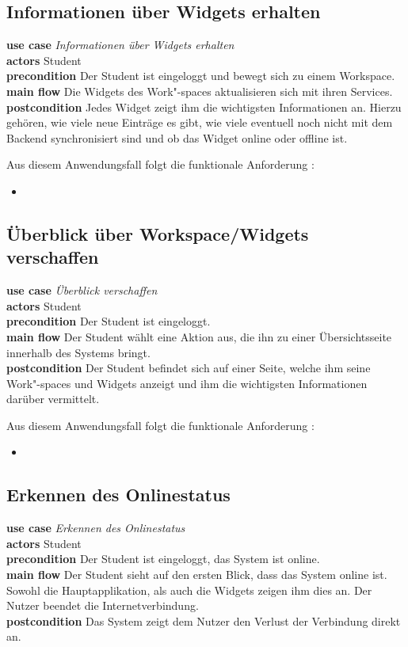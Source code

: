 \subsection{Informationen über Widgets erhalten}
\textbf{use case} \emph{Informationen über Widgets erhalten}\\
\textbf{actors} Student\\
\textbf{precondition} Der Student ist eingeloggt und bewegt sich zu einem Workspace.\\
\textbf{main flow} Die Widgets des Work"-spaces aktualisieren sich mit ihren Services. \\
\textbf{postcondition} Jedes Widget zeigt ihm die wichtigsten Informationen an. Hierzu gehören, wie viele neue Einträge es gibt, wie viele eventuell noch nicht mit dem Backend synchronisiert sind und ob das Widget online oder offline ist.
 
Aus diesem Anwendungsfall folgt die funktionale Anforderung :
\begin{itemize}
 \item \requirement{\requirementWidgetInformSystem}\label{requirementWidgetInformSystem}
\end{itemize}

\subsection{Überblick über Workspace/Widgets verschaffen}
\textbf{use case} \emph{Überblick verschaffen}\\
\textbf{actors} Student\\
\textbf{precondition} Der Student ist eingeloggt.\\
\textbf{main flow} Der Student wählt eine Aktion aus, die ihn zu einer Übersichtsseite innerhalb des Systems bringt.\\
\textbf{postcondition} Der Student befindet sich auf einer Seite, welche ihm seine Work"-spaces und Widgets anzeigt und ihm die wichtigsten Informationen darüber vermittelt.

Aus diesem Anwendungsfall folgt die funktionale Anforderung :
\begin{itemize}
 \item \requirement{\requirementDashboard}\label{requirementDashboard}
\end{itemize}

\subsection{Erkennen des Onlinestatus}
\textbf{use case} \emph{Erkennen des Onlinestatus}\\
\textbf{actors} Student\\
\textbf{precondition} Der Student ist eingeloggt, das System ist online.\\
\textbf{main flow} Der Student sieht auf den ersten Blick, dass das System online ist. Sowohl die Hauptapplikation, als auch die Widgets zeigen ihm dies an. Der Nutzer beendet die Internetverbindung.\\
\textbf{postcondition} Das System zeigt dem Nutzer den Verlust der Verbindung direkt an.
 
